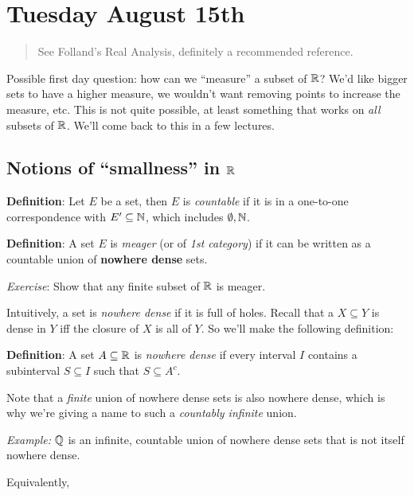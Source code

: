 \hypertarget{tuesday-august-15th}{%
\section{Tuesday August 15th}\label{tuesday-august-15th}}

\begin{quote}
See Folland's Real Analysis, definitely a recommended reference.
\end{quote}

Possible first day question: how can we ``measure'' a subset of \({\mathbb{R}}\)?
We'd like bigger sets to have a higher measure, we wouldn't want
removing points to increase the measure, etc. This is not quite
possible, at least something that works on \emph{all} subsets of
\({\mathbb{R}}\). We'll come back to this in a few lectures.

\hypertarget{notions-of-smallness-in-rr}{%
\subsection{\texorpdfstring{Notions of ``smallness'' in
\({\mathbb{R}}\)}{Notions of ``smallness'' in \textbackslash RR}}\label{notions-of-smallness-in-rr}}

\textbf{Definition}: Let \(E\) be a set, then \(E\) is \emph{countable}
if it is in a one-to-one correspondence with \(E' \subseteq {\mathbb{N}}\), which
includes \(\emptyset, {\mathbb{N}}\).

\textbf{Definition}: A set \(E\) is \emph{meager} (or of \emph{1st
category}) if it can be written as a countable union of \textbf{nowhere
dense} sets.

\emph{Exercise}: Show that any finite subset of \({\mathbb{R}}\) is meager.

Intuitively, a set is \emph{nowhere dense} if it is full of holes.
Recall that a \(X \subseteq Y\) is dense in \(Y\) iff the closure of
\(X\) is all of \(Y\). So we'll make the following definition:

\textbf{Definition}: A set \(A \subseteq {\mathbb{R}}\) is \emph{nowhere dense}
if every interval \(I\) contains a subinterval \(S \subseteq I\) such
that \(S \subseteq A^c\).

Note that a \emph{finite} union of nowhere dense sets is also nowhere
dense, which is why we're giving a name to such a \emph{countably
infinite} union.

\emph{Example:} \({\mathbb{Q}}\) is an infinite, countable union of nowhere dense
sets that is not itself nowhere dense.

Equivalently,


